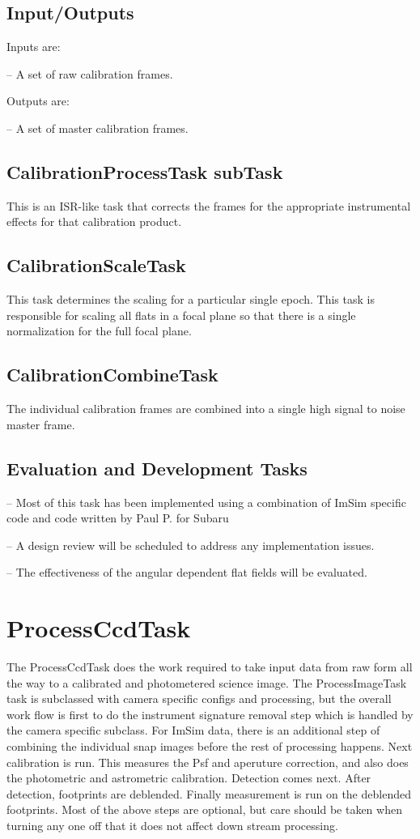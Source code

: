 \documentclass[12pt]{article}
\begin{document}
\subsection{Input/Outputs}
Inputs are:

-- A set of raw calibration frames.

Outputs are:

-- A set of master calibration frames.

\subsection{CalibrationProcessTask subTask}
This is an ISR-like task that corrects the frames for the appropriate instrumental effects for that calibration
product.

\subsection{CalibrationScaleTask}
This task determines the scaling for a particular single epoch.  This task is responsible for
scaling all flats in a focal plane so that there is a single normalization for the full focal plane.

\subsection{CalibrationCombineTask}
The individual calibration frames are combined into a single high signal to noise master frame. 

\subsection{Evaluation and Development Tasks}
-- Most of this task has been implemented using a combination of ImSim specific code and code written by Paul P. for Subaru

-- A design review will be scheduled to address any implementation issues.

-- The effectiveness of the angular dependent flat fields will be evaluated.



\clearpage 
\section{ProcessCcdTask\label{processccdsec}} 
The ProcessCcdTask does the work required to take input data from raw form all the way to a calibrated and
photometered science image.  The ProcessImageTask task is subclassed with camera specific configs and processing, but the overall 
work flow is first to do the instrument signature removal step which is handled by the camera specific subclass.  For ImSim
data, there is an additional step of combining the individual snap images before the rest of processing happens. Next calibration
is run.  This measures the Psf and aperuture correction, and also does the photometric and astrometric calibration.  
Detection comes next.  After detection, footprints are deblended.
Finally measurement is run on the deblended footprints.  Most of the above steps are optional, but care should be taken
when turning any one off that it does not affect down stream processing.
\end{document}

